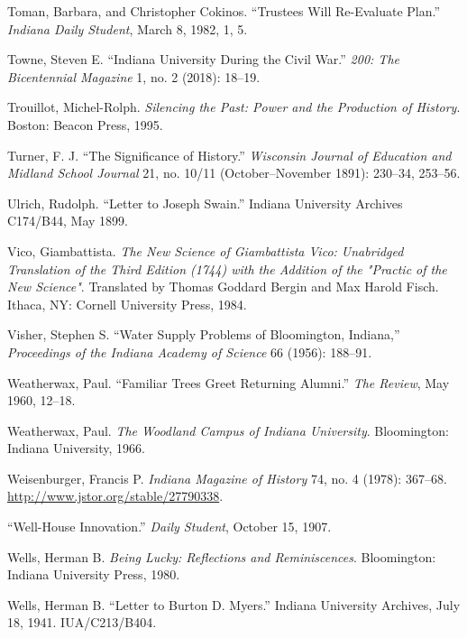 \documentclass[
  american,
  letterpaper,
]{scrreprt}
\newlength{\cslhangindent}
\newenvironment{CSLReferences}[2] %
 {\begin{list}{}{%
  \setlength{\itemindent}{0pt}
  \setlength{\leftmargin}{0pt}
  \setlength{\parsep}{0pt}
  \ifodd #1
   \setlength{\leftmargin}{\cslhangindent}
   \setlength{\itemindent}{-1\cslhangindent}
  \fi
  \setlength{\itemsep}{#2\baselineskip}}}
 {\end{list}}
\begin{document}
\begin{CSLReferences}{1}{0}
Toman, Barbara, and Christopher Cokinos. {``Trustees Will Re-Evaluate
Plan.''} \emph{Indiana Daily Student}, March 8, 1982, 1, 5.

Towne, Steven E. {``Indiana University During the Civil War.''}
\emph{200: The Bicentennial Magazine} 1, no. 2 (2018): 18--19.

Trouillot, Michel-Rolph. \emph{Silencing the Past: Power and the
Production of History}. Boston: Beacon Press, 1995.

Turner, F. J. {``The Significance of History.''} \emph{Wisconsin Journal
of Education and Midland School Journal} 21, no. 10/11
(October--November 1891): 230--34, 253--56.

Ulrich, Rudolph. {``Letter to Joseph Swain.''} Indiana University
Archives C174/B44, May 1899.

Vico, Giambattista. \emph{The New Science of Giambattista Vico:
Unabridged Translation of the Third Edition (1744) with the Addition of
the "Practic of the New Science"}. Translated by Thomas Goddard Bergin
and Max Harold Fisch. Ithaca, NY: Cornell University Press, 1984.

Visher, Stephen S. {``Water Supply Problems of Bloomington, Indiana,''}
\emph{Proceedings of the Indiana Academy of Science} 66 (1956): 188--91.

Weatherwax, Paul. {``Familiar Trees Greet Returning Alumni.''} \emph{The
Review}, May 1960, 12--18.

Weatherwax, Paul. \emph{The Woodland Campus of Indiana University}.
Bloomington: Indiana University, 1966.

Weisenburger, Francis P. \emph{Indiana Magazine of History} 74, no. 4
(1978): 367--68. \url{http://www.jstor.org/stable/27790338}.

{``Well-House Innovation.''} \emph{Daily Student}, October 15, 1907.

Wells, Herman B. \emph{Being Lucky: Reflections and Reminiscences}.
Bloomington: Indiana University Press, 1980.

Wells, Herman B. {``Letter to Burton {D.} Myers.''} Indiana University
Archives, July 18, 1941. IUA/C213/B404.


\end{CSLReferences}
\end{document}
